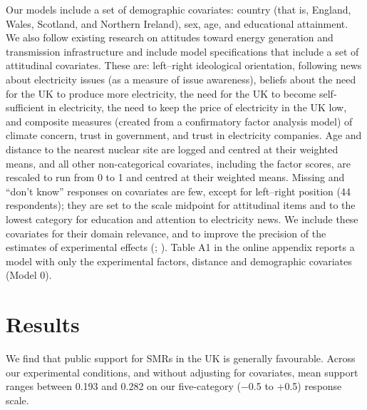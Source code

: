 \documentclass[a4paper, 11pt]{article}
\begin{document}
Our models include a set of demographic covariates: country (that is, England, Wales, Scotland, and Northern Ireland), sex, age, and educational attainment. We also follow existing research on attitudes toward energy generation and transmission infrastructure \citep{aina_poy2026,konisky2020} and include model specifications that include a set of attitudinal covariates. These are: left--right ideological orientation, following news about electricity issues (as a measure of issue awareness), beliefs about the need for the UK to produce more electricity, the need for the UK to become self-sufficient in electricity, the need to keep the price of electricity in the UK low, and composite measures (created from a confirmatory factor analysis model) of climate concern, trust in government, and trust in electricity companies. Age and distance to the nearest nuclear site are logged and centred at their weighted means, and all other non-categorical covariates, including the factor scores, are rescaled to run from 0 to 1 and centred at their weighted means. Missing and ``don't know'' responses on covariates are few, except for left--right position (44 respondents); they are set to the scale midpoint for attitudinal items and to the lowest category for education and attention to electricity news. We include these covariates for their domain relevance, and to improve the precision of the estimates of experimental effects (\citealp[pp.~96--105]{gerber2012}; \citealp{lin2013}). Table A1 in the online appendix reports a model with only the experimental factors, distance and demographic covariates (Model 0).

\section{Results}

We find that public support for SMRs in the UK is generally favourable. Across our experimental conditions, and without adjusting for covariates, mean support ranges between 0.193 and 0.282 on our five-category ($-$0.5 to +0.5) response scale.
\end{document}
